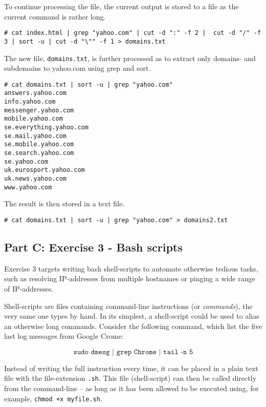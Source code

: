 To continue processing the file, the current output is stored to
a file as the current command is rather long.

\begin{lstlisting}[numbers=none, language={}, frame=single, framexleftmargin={0.2em}]
# cat index.html | grep "yahoo.com" | cut -d ":" -f 2 |  cut -d "/" -f 3 | sort -u | cut -d "\"" -f 1 > domains.txt
\end{lstlisting}

The new file, \texttt{domains.txt}, is further processed as to
extract only domains- and subdomains to yahoo.com using grep
and sort.

\begin{lstlisting}[numbers=none, language={}, frame=single, framexleftmargin={0.2em}]
# cat domains.txt | sort -u | grep "yahoo.com"
answers.yahoo.com
info.yahoo.com
messenger.yahoo.com
mobile.yahoo.com
se.everything.yahoo.com
se.mail.yahoo.com
se.mobile.yahoo.com
se.search.yahoo.com
se.yahoo.com
uk.eurosport.yahoo.com
uk.news.yahoo.com
www.yahoo.com
\end{lstlisting}

The result is then stored in a text file.

\begin{lstlisting}[numbers=none, language={}, frame=single, framexleftmargin={0.2em}]
# cat domains.txt | sort -u | grep "yahoo.com" > domains2.txt
\end{lstlisting}

\pagebreak
\subsection{Part C: Exercise 3 - Bash scripts}
Exercise 3 targets writing bash shell-scripts to automate otherwise tedious
tasks, such as resolving IP-addresses from multiple hostnames or pinging a
wide range of IP-addresses.

Shell-scripts are files containing command-line instructions (or \textit{commands}),
the very same one types by hand. In its simplest, a shell-script could be used to alias an
otherwise long commands. Consider the following command, which list the five last log
messages from Google Crome:

$$\texttt{sudo dmesg | grep Chrome | tail -n 5}$$

Instead of writing the full instruction every time, it can be placed in a plain
text file with the file-extension \texttt{.sh}. This file (shell-script) can
then be called directly from the command-line -- as long as it has been allowed
to be executed using, for example, \texttt{chmod +x myfile.sh}.

